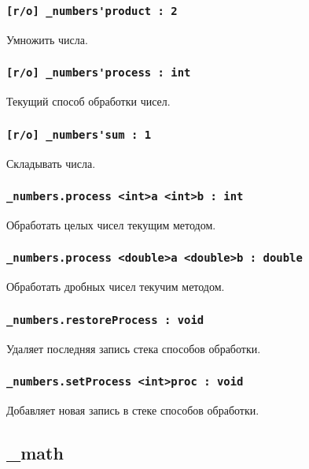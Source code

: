 \subsubsection{\lstinline|[r/o] _numbers'product : 2|}

Умножить числа.

\subsubsection{\lstinline|[r/o] _numbers'process : int|}

Текущий способ обработки чисел.

\subsubsection{\lstinline|[r/o] _numbers'sum : 1|}

Складывать числа.

\subsubsection{\lstinline|_numbers.process <int>a <int>b : int|}

Обработать целых чисел текущим методом.

\subsubsection{\lstinline|_numbers.process <double>a <double>b : double|}

Обработать дробных чисел текучим методом.

\subsubsection{\lstinline|_numbers.restoreProcess : void|}

Удаляет последняя запись стека способов обработки.

\subsubsection{\lstinline|_numbers.setProcess <int>proc : void|}

Добавляет новая запись в стеке способов обработки.

\subsection{{\color{orange} \_math}}


